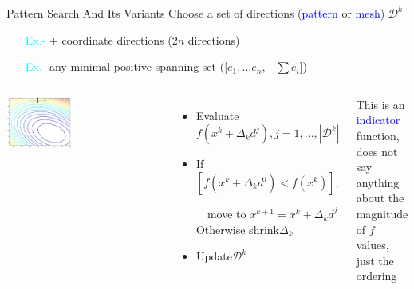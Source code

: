 \documentclass[handout,aspectratio=54]{beamer}
\numberwithin{theorem}{section}
\begin{document}
\begin{frame}{Pattern Search And Its Variants}\footnotesize
Choose a set of directions (\textcolor{blue}{pattern} or \textcolor{blue}{mesh}) $\mathcal{D}^k$

\begin{itemize}
\item[\textcolor{cyan}{Ex.-}] $\pm$ coordinate directions ($2n$ directions)
\item[\textcolor{cyan}{Ex.-}] any minimal positive spanning set ([$e_1,...e_n,-\sum e_i$])
\end{itemize}

\begin{columns}
\includegraphics[width=\textwidth]{fig/17-1.jpg}

\colorbox[rgb]{0.5,0.6,0.7}{\textcolor{white}{Basic iteration($k\ge0$):}}
\begin{itemize}\scriptsize
\item Evaluate $f(x^k+\Delta_kd^j),j=1,...,|\mathcal{D}^k|$
\item If $[f(x^k+\Delta_kd^j)<f(x^k)]$, 

$\quad$move to $x^{k+1}=x^k+\Delta_kd^j$\\

Otherwise shrink$\Delta_k$
\item Update$\mathcal{D}^k$
\end{itemize}
This is an \textcolor{blue}{indicator} function, does not say anything about the magnitude of $f$ values, just the ordering
\end{columns}

\vspace{1.2cm}

\tiny
{}

\end{frame}
\end{document}
